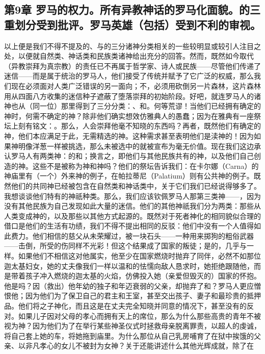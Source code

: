 
\subsection{第9章 罗马的权力。所有异教神话的罗马化面貌。的三重划分受到批评。罗马英雄（包括）受到不利的审视。}

以上便是我们不得不提及的、与的三分诸神分类相关的一些较明显或较引人注目之处，以便就自然类、神话类和民族类诸神给出充分的回答。然而，既然如今取代（异教崇拜为真宗教）的责任已不再属于哲学家、诗人或民族——尽管他们传递了迷信——而是属于统治的罗马人，他们接受了传统并赋予了它广泛的权威，那么我们现在必须面对人类广泛错误的另一面向；不，必须用砍倒另一片森林，这片森林用从四面八方收集的迷信种子遮蔽了堕落崇拜的初始阶段。好吧，就连罗马人的诸神也从（同一位）那里得到了三分分类：、和。何等荒谬！当他们已经拥有确定的神时，何需不确定的神？除非他们确实想效仿雅典人的愚蠢；因为在雅典有一座祭坛上刻有铭文：。那么，人会崇拜他毫不知晓的东西吗？再者，既然他们有确定的神，他们本应满足于此，无需精选的神。这种需求甚至表明他们是渎神的！因为如果神明像洋葱一样被挑选，那么未被选中的就被宣布为毫无价值。现在我们这边承认罗马人有两类神：的和；换言之，即他们与其他民族共有的神，以及他们自己创造的神。这些不是被称为神和神吗？他们的祭坛告诉我们：在卡尔娜（Carna）的神庙里有（一个）外来神的例子，在帕拉蒂尼（Palatium）则有公共神的例子。既然他们的共同神已经被包含在自然类和神话类中，关于它们我们已经说得够多了。我想谈谈他们特有的神祇种类。那么，我们应该钦佩罗马人那第三类神——，因为没有其他民族为自己发现如此大量的迷信。他们的其他神祇我们分为两类：那些从人类变成神的，以及那些以其他方式起源的。既然对于死者神化的相同貌似合理的借口是他们的生活有功绩，我们不得不提出相同的反驳：他们中没有一个人值得如此费力。他们相信的慈父从未荣耀过，被一块石头——一种用来掷狗的粗俗武器——击倒，所受的伤同样不光彩！但这个结果成了国家的叛徒；是的，几乎与一样。如果他们不相信这对他属实，他至少在国家燃烧时抛弃了同伴，必然不如那位迦太基妇女，她的丈夫像我们一样以温和的怯懦向敌人恳求时，她拒绝跟随他，而是带着孩子冲入燃烧的迦太基的火焰，仿佛投入她（亲爱但毁灭的）国家的怀抱。他是吗？因（救出）他年幼的独子和年迈衰弱的父亲，却抛弃了和？罗马人更应憎恨他；因为他们为了保卫自己的君主和王室，甚至交出孩子、妻子和最珍贵的抵押品。他们将之子神化，而且这是在丈夫完全知晓并同意的情况下，甚至没有的反对。如果儿子因对父母的孝心而拥有天上的席位，那么为什么那些高贵的青年不被视为神？因为他们为了在举行某些神圣仪式时拯救母亲脱离罪责，以超人的虔诚，将自己套上她的车，将她拖到庙里。为什么那位从自己乳房哺育了在狱中挨饿的父亲、以非凡孝心的女儿不被封为女神？关于还能讲述什么其他光辉成就，除了在\Origina